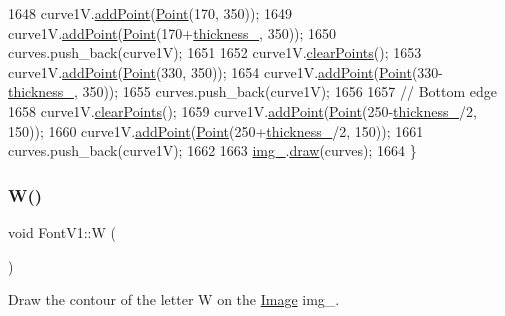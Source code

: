 \begin{DoxyCode}
1648     curve1V.\mbox{\hyperlink{class_bezier_curve_a38d16c18b36ae45619b05e26e226cf34}{addPoint}}(\mbox{\hyperlink{class_point}{Point}}(170, 350));
1649     curve1V.\mbox{\hyperlink{class_bezier_curve_a38d16c18b36ae45619b05e26e226cf34}{addPoint}}(\mbox{\hyperlink{class_point}{Point}}(170+\mbox{\hyperlink{class_font_v1_aed8040e76be9a52833627b92f0fb4e5f}{thickness\_}}, 350));
1650     curves.push\_back(curve1V);
1651 
1652     curve1V.\mbox{\hyperlink{class_bezier_curve_a0ba8ce66d5af5971ae6a1b506029728e}{clearPoints}}();
1653     curve1V.\mbox{\hyperlink{class_bezier_curve_a38d16c18b36ae45619b05e26e226cf34}{addPoint}}(\mbox{\hyperlink{class_point}{Point}}(330, 350));
1654     curve1V.\mbox{\hyperlink{class_bezier_curve_a38d16c18b36ae45619b05e26e226cf34}{addPoint}}(\mbox{\hyperlink{class_point}{Point}}(330-\mbox{\hyperlink{class_font_v1_aed8040e76be9a52833627b92f0fb4e5f}{thickness\_}}, 350));
1655     curves.push\_back(curve1V);
1656 
1657     \textcolor{comment}{// Bottom edge}
1658     curve1V.\mbox{\hyperlink{class_bezier_curve_a0ba8ce66d5af5971ae6a1b506029728e}{clearPoints}}();
1659     curve1V.\mbox{\hyperlink{class_bezier_curve_a38d16c18b36ae45619b05e26e226cf34}{addPoint}}(\mbox{\hyperlink{class_point}{Point}}(250-\mbox{\hyperlink{class_font_v1_aed8040e76be9a52833627b92f0fb4e5f}{thickness\_}}/2, 150));
1660     curve1V.\mbox{\hyperlink{class_bezier_curve_a38d16c18b36ae45619b05e26e226cf34}{addPoint}}(\mbox{\hyperlink{class_point}{Point}}(250+\mbox{\hyperlink{class_font_v1_aed8040e76be9a52833627b92f0fb4e5f}{thickness\_}}/2, 150));
1661     curves.push\_back(curve1V);
1662 
1663     \mbox{\hyperlink{class_font_v1_a00569e3e3c4b70f437b63f396f735fb0}{img\_}}.\mbox{\hyperlink{class_image_a8d162f3cab956131d58708c09aa560b0}{draw}}(curves);
1664 \}
\end{DoxyCode}
\mbox{\label{class_font_v1_aa4e67840b676dfffd3e03d873013174c}} 
\subsubsection{\texorpdfstring{W()}{W()}}
{\footnotesize\ttfamily void Font\+V1\+::W (\begin{DoxyParamCaption}{ }\end{DoxyParamCaption})}



Draw the contour of the letter W on the \mbox{\hyperlink{class_image}{Image}} img\+\_\+. 


